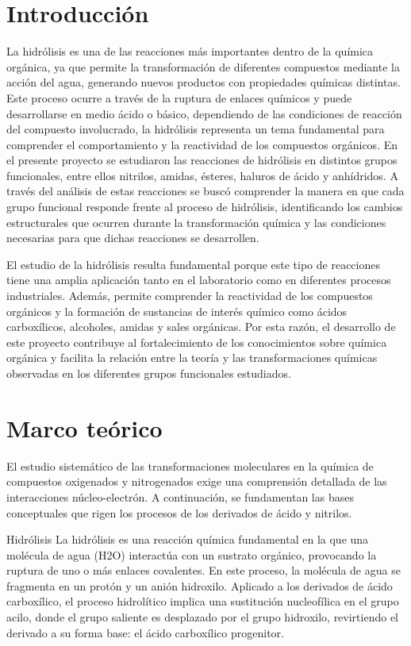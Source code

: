\documentclass{article}
\begin{document}
\section{Introducción}
La hidrólisis es una de las reacciones más importantes dentro de la química orgánica, ya que permite la transformación de diferentes compuestos mediante la acción del agua, generando nuevos productos con propiedades químicas distintas. Este proceso ocurre a través de la ruptura de enlaces químicos y puede desarrollarse en medio ácido o básico, dependiendo de las condiciones de reacción del compuesto involucrado, la hidrólisis representa un tema fundamental para comprender el comportamiento y la reactividad de los compuestos orgánicos.                                                                                                                                           En el presente proyecto se estudiaron las reacciones de hidrólisis en distintos grupos funcionales, entre ellos nitrilos, amidas, ésteres, haluros de ácido y anhídridos. A través del análisis de estas reacciones se buscó comprender la manera en que cada grupo funcional responde frente al proceso de hidrólisis, identificando los cambios estructurales que ocurren durante la transformación química y las condiciones necesarias para que dichas reacciones se desarrollen.

El estudio de la hidrólisis resulta fundamental porque este tipo de reacciones tiene una amplia aplicación tanto en el laboratorio como en diferentes procesos industriales. Además, permite comprender la reactividad de los compuestos orgánicos y la formación de sustancias de interés químico como ácidos carboxílicos, alcoholes, amidas y sales orgánicas. Por esta razón, el desarrollo de este proyecto contribuye al fortalecimiento de los conocimientos sobre química orgánica y facilita la relación entre la teoría y las transformaciones químicas observadas en los diferentes grupos funcionales estudiados.

\section{Marco teórico}
El estudio sistemático de las transformaciones moleculares en la química de compuestos oxigenados y nitrogenados exige una comprensión detallada de las interacciones núcleo-electrón. A continuación, se fundamentan las bases conceptuales que rigen los procesos de los derivados de ácido y nitrilos.

Hidrólisis
La hidrólisis es una reacción química fundamental en la que una molécula de agua (H2O) interactúa con un sustrato orgánico, provocando la ruptura de uno o más enlaces covalentes. En este proceso, la molécula de agua se fragmenta en un protón y un anión hidroxilo. Aplicado a los derivados de ácido carboxílico, el proceso hidrolítico implica una sustitución nucleofílica en el grupo acilo, donde el grupo saliente es desplazado por el grupo hidroxilo, revirtiendo el derivado a su forma base: el ácido carboxílico progenitor.
\end{document}
